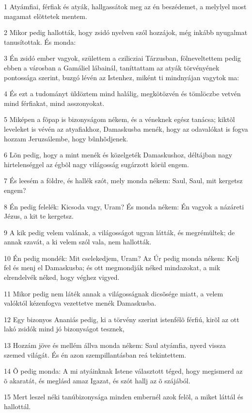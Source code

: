 \par 1 Atyámfiai, férfiak és atyák, hallgassátok meg az én beszédemet, a melylyel most magamat elõttetek mentem.
\par 2 Mikor pedig hallották, hogy zsidó nyelven szól hozzájok, még inkább nyugalmat tanusítottak. És monda:
\par 3 Én zsidó ember vagyok, születtem a czilicziai Tárzusban, fölneveltettem pedig ebben a városban a Gamáliel lábainál, taníttattam az atyák törvényének  pontossága szerint, buzgó lévén az Istenhez, miként ti mindnyájan vagytok ma:
\par 4 És ezt a tudományt üldöztem mind halálig, megkötözvén és tömlöczbe vetvén mind férfiakat, mind asszonyokat.
\par 5 Miképen a fõpap is bizonyságom nékem, és a véneknek egész tanácsa; kiktõl leveleket is vévén az atyafiakhoz, Damaskusba menék, hogy az odavalókat is fogva hozzam Jeruzsálembe, hogy bûnhõdjenek.
\par 6 Lõn pedig, hogy a mint menék és közelgeték Damaskushoz, déltájban nagy hirtelenséggel az égbõl nagy világosság sugárzott körül engem.
\par 7 És leesém a földre, és hallék szót, mely monda nékem: Saul, Saul, mit kergetsz engem?
\par 8 Én pedig felelék: Kicsoda vagy, Uram? És monda nékem: Én vagyok a názáreti Jézus, a kit te kergetsz.
\par 9 A kik pedig velem valának, a világosságot ugyan látták, és megrémültek; de annak szavát, a ki velem szól vala, nem hallották.
\par 10 Én pedig mondék: Mit cselekedjem, Uram? Az Úr pedig monda nékem: Kelj fel és menj el Damaskusba; és ott megmondják néked mindazokat, a mik elrendelvék néked, hogy véghez vigyed.
\par 11 Mikor pedig nem láték annak a világosságnak dicsõsége miatt, a velem valóktól kézenfogva vezettetve menék Damaskusba.
\par 12 Egy bizonyos Ananiás pedig, ki a törvény szerint istenfélõ férfiú, kirõl az ott lakó zsidók mind jó bizonyságot tesznek,
\par 13 Hozzám jöve és mellém állva monda nékem: Saul atyámfia, nyerd vissza szemed világát. És én azon szempillantásban reá tekintettem.
\par 14 Õ pedig monda: A mi atyáinknak Istene választott téged, hogy megismerd az õ akaratát, és meglásd amaz Igazat, és szót hallj az õ szájából.
\par 15 Mert leszel néki tanúbizonysága minden embernél azok felõl, a miket láttál és hallottál.
